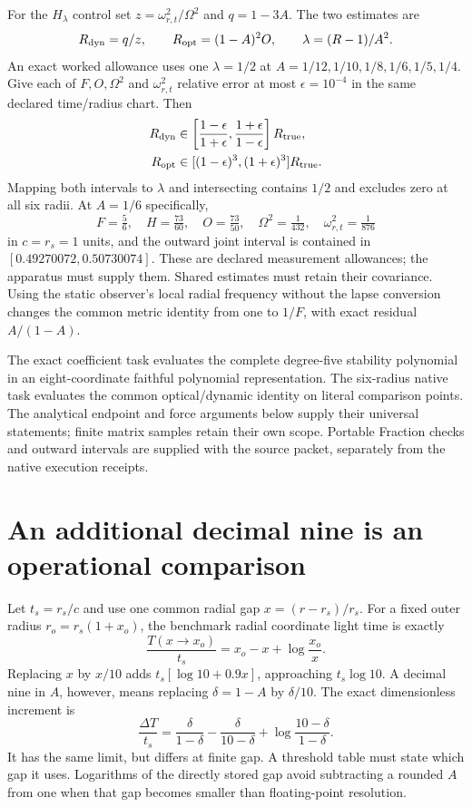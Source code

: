 \documentclass[10pt,twocolumn,letterpaper]{article}
\begin{document}
For the $H_\lambda$ control set $z=\omega_{r,t}^2/\Omega^2$ and
$q=1-3A$. The two estimates are
\[
 R_{\rm dyn}=q/z,\qquad R_{\rm opt}=(1-A)^2O,
 \qquad\lambda=(R-1)/A^2.
\]
An exact worked allowance uses one $\lambda=1/2$ at
$A=1/12,1/10,1/8,1/6,1/5,1/4$. Give each of $F,O,\Omega^2$ and
$\omega_{r,t}^2$ relative error at most $\epsilon=10^{-4}$ in the
same declared time/radius chart. Then
\begin{align*}
 R_{\rm dyn}&\in\left[\frac{1-\epsilon}{1+\epsilon},
                 \frac{1+\epsilon}{1-\epsilon}\right]R_{\rm true},\\
 R_{\rm opt}&\in[(1-\epsilon)^3,(1+\epsilon)^3]R_{\rm true}.
\end{align*}
Mapping both intervals to $\lambda$ and intersecting contains $1/2$
and excludes zero at all six radii. At $A=1/6$ specifically,
\[
 F=\tfrac56,\quad H=\tfrac{73}{60},\quad O=\tfrac{73}{50},\quad
 \Omega^2=\tfrac1{432},\quad\omega_{r,t}^2=\tfrac1{876}
\]
in $c=r_s=1$ units, and the outward joint interval is contained in
$[0.49270072,0.50730074]$. These are declared measurement allowances;
the apparatus must supply them. Shared estimates must retain their
covariance. Using the static observer's local radial frequency without
the lapse conversion changes the common metric identity from one to
$1/F$, with exact residual $A/(1-A)$.

The exact coefficient task evaluates the complete degree-five
stability polynomial in an eight-coordinate faithful polynomial
representation. The six-radius native task evaluates the common
optical/dynamic identity on literal comparison points. The analytical
endpoint and force arguments below supply their universal statements;
finite matrix samples retain their own scope. Portable Fraction checks
and outward intervals are supplied with the source packet, separately
from the native execution receipts.


\section{An additional decimal nine is an operational comparison}
Let $t_s=r_s/c$ and use one common radial gap $x=(r-r_s)/r_s$.
For a fixed outer radius $r_o=r_s(1+x_o)$, the benchmark radial
coordinate light time is exactly
\begin{equation}
 \frac{T(x\to x_o)}{t_s}=x_o-x+\log\frac{x_o}{x}.
 \label{eq:gap-road}
\end{equation}
Replacing $x$ by $x/10$ adds $t_s[\log10+0.9x]$, approaching
$t_s\log10$. A decimal nine in $A$, however, means replacing
$\delta=1-A$ by $\delta/10$. The exact dimensionless increment is
\begin{equation}
 \frac{\Delta T}{t_s}=
 \frac\delta{1-\delta}-\frac\delta{10-\delta}
 +\log\frac{10-\delta}{1-\delta}.
 \label{eq:A-nine-increment}
\end{equation}
It has the same limit, but differs at finite gap. A threshold table must
state which gap it uses. Logarithms of the directly stored gap avoid
subtracting a rounded $A$ from one when that gap becomes smaller than
floating-point resolution.
\end{document}

